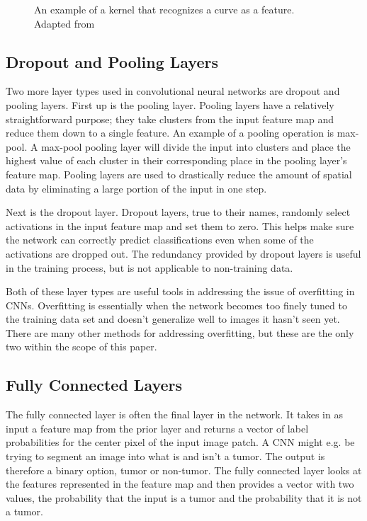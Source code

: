 \documentclass{sig-alternate}
\begin{document}
\begin{figure}
\centering
{}
\caption{An example of a kernel that recognizes a curve as a feature. Adapted from~\cite{deshpande_2016}}
\label{fig:Kernel}
\end{figure}

\subsection{Dropout and Pooling Layers}
\label{sec:poolingLayers}

Two more layer types used in convolutional neural networks are dropout and pooling layers. First up is the pooling layer. Pooling layers have a relatively straightforward purpose; they take clusters from the input feature map and reduce them down to a single feature. An example of a pooling operation is max-pool. A max-pool pooling layer will divide the input into clusters and place the highest value of each cluster in their corresponding place in the pooling layer's feature map. Pooling layers are used to drastically reduce the amount of spatial data by eliminating a large portion of the input in one step.

Next is the dropout layer. Dropout layers, true to their names, randomly select activations in the input feature map and set them to zero. This helps make sure the network can correctly predict classifications even when some of the activations are dropped out. The redundancy provided by dropout layers is useful in the training process, but is not applicable to non-training data.

Both of these layer types are useful tools in addressing the issue of overfitting in CNNs. Overfitting is essentially when the network becomes too finely tuned to the training data set and doesn't generalize well to images it hasn't seen yet. There are many other methods for addressing overfitting, but these are the only two within the scope of this paper.

\subsection{Fully Connected Layers}
\label{sec:fullyConnected}

The fully connected layer is often the final layer in the network. It takes in as input a feature map from the prior layer and returns a vector of label probabilities for the center pixel of the input image patch. A CNN might e.g. be trying to segment an image into what is and isn't a tumor. The output is therefore a binary option, tumor or non-tumor. The fully connected layer looks at the features represented in the feature map and then provides a vector with two values, the probability that the input is a tumor and the probability that it is not a tumor.
\end{document}
